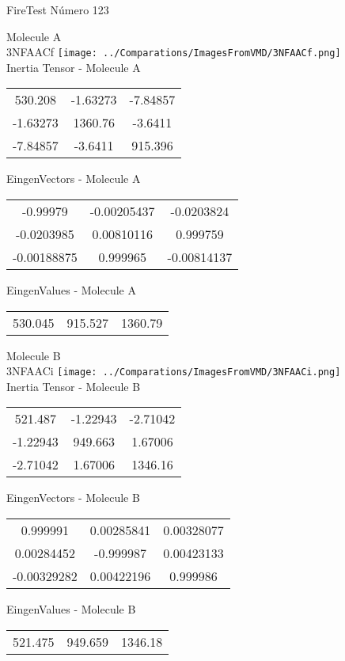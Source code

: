 \vtab[-2cm]
\begin{center}
{\large FireTest \tab Número 123}
\end{center}
\begin{multicols}{2}
\begin{center}

Molecule A \\ 
3NFAACf
\texttt{[image: ../Comparations/ImagesFromVMD/3NFAACf.png]}
\\
Inertia Tensor - Molecule A \\
\vtab

\begin{tabular}{|c c c|}
530.208	 & 	-1.63273	 & 	-7.84857	 \\
-1.63273	 & 	1360.76	 & 	-3.6411	 \\
-7.84857	 & 	-3.6411	 & 	915.396
\end{tabular}

\vtab
 EingenVectors - Molecule A     \\
\vtab
\begin{tabular}{|c c c|}
-0.99979	 & 	-0.00205437	 & 	-0.0203824	 \\
-0.0203985	 & 	0.00810116	 & 	0.999759	 \\
-0.00188875	 & 	0.999965	 & 	-0.00814137
\end{tabular}

\vtab
 EingenValues - Molecule A     \\
\vtab
\begin{tabular}{|c c c|}
530.045	 & 	915.527	 & 	1360.79	 \\
\end{tabular}
\columnbreak

Molecule B \\ 
3NFAACi
\texttt{[image: ../Comparations/ImagesFromVMD/3NFAACi.png]}
\\
Inertia Tensor - Molecule B \\
\vtab

\begin{tabular}{|c c c|}
521.487	 & 	-1.22943	 & 	-2.71042	 \\
-1.22943	 & 	949.663	 & 	1.67006	 \\
-2.71042	 & 	1.67006	 & 	1346.16
\end{tabular}

\vtab
 EingenVectors - Molecule B     \\
\vtab
\begin{tabular}{|c c c|}
0.999991	 & 	0.00285841	 & 	0.00328077	 \\
0.00284452	 & 	-0.999987	 & 	0.00423133	 \\
-0.00329282	 & 	0.00422196	 & 	0.999986
\end{tabular}

\vtab
 EingenValues - Molecule B     \\
\vtab
\begin{tabular}{|c c c|}
521.475	 & 	949.659	 & 	1346.18	 \\
\end{tabular}

\end{center}
\end{multicols}
